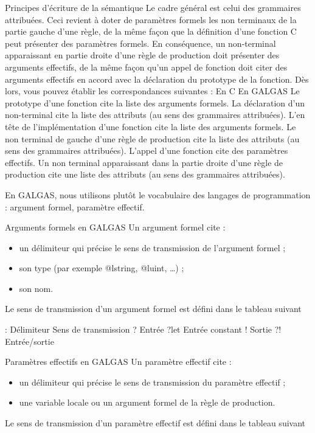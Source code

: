 Principes d'écriture de la sémantique
Le cadre général est celui des grammaires attribuées. Ceci revient à doter de paramètres formels les non terminaux de la partie gauche d'une règle, de la même façon que la définition d'une fonction C peut présenter des paramètres formels. En conséquence, un non-terminal apparaissant en partie droite d'une règle de production doit présenter des arguments effectifs, de la même façon qu'un appel de fonction doit citer des arguments effectifs en accord avec la déclaration du prototype de la fonction. Dès lors, vous pouvez établir les correspondances suivantes :
En C	En GALGAS
Le prototype d'une fonction cite la liste des arguments formels.	La déclaration d'un non-terminal cite la liste des attributs (au sens des grammaires attribuées).
L'en tête de l'implémentation d'une fonction cite la liste des arguments formels.	Le non terminal de gauche d'une règle de production cite la liste des attributs (au sens des grammaires attribuées).
L'appel d'une fonction cite des paramètres effectifs.	Un non terminal apparaissant dans la partie droite d'une règle de production cite une liste des attributs (au sens des grammaires attribuées).

En GALGAS, nous utilisons plutôt le vocabulaire des langages de programmation : argument formel, paramètre effectif.

Arguments formels en GALGAS
Un argument formel cite :
\begin{itemize}
  \item un délimiteur qui précise le sens de transmission de l'argument formel ;
  \item son type (par exemple @lstring, @luint, …) ;
  \item son nom.
\end{itemize}


Le sens de transmission d'un argument formel est défini dans le tableau suivant 

:
Délimiteur	Sens de transmission
?	Entrée
?let	Entrée constant
!	Sortie
?!	Entrée/sortie

Paramètres effectifs en GALGAS
Un paramètre effectif cite :
\begin{itemize}
  \item un délimiteur qui précise le sens de transmission du paramètre effectif ;
  \item une variable locale ou un argument formel de la règle de production.
\end{itemize}

Le sens de transmission d'un paramètre effectif est défini dans le tableau suivant 

